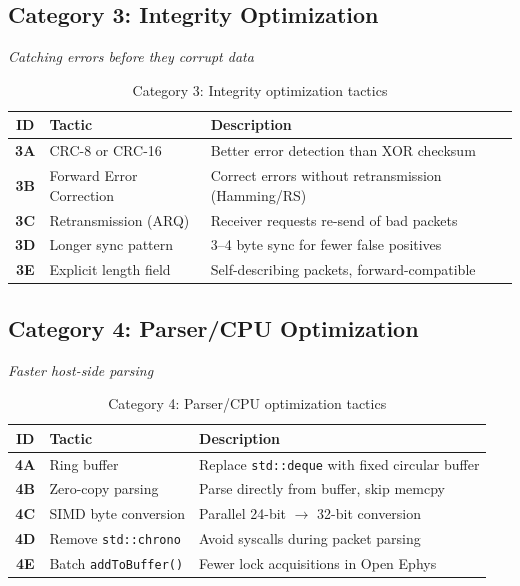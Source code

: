 \documentclass[11pt,a4paper]{article}
\newcommand{\tactic}[1]{\textbf{#1}}
\begin{document}
\subsection{Category 3: Integrity Optimization}
\textit{Catching errors before they corrupt data}

\begin{table}[H]
\centering
\small
\begin{tabularx}{\textwidth}{|c|l|X|}
\hline
\textbf{ID} & \textbf{Tactic} & \textbf{Description} \\\hline
\tactic{3A} & CRC-8 or CRC-16 & Better error detection than XOR checksum \\
\tactic{3B} & Forward Error Correction & Correct errors without retransmission (Hamming/RS) \\
\tactic{3C} & Retransmission (ARQ) & Receiver requests re-send of bad packets \\
\tactic{3D} & Longer sync pattern & 3--4 byte sync for fewer false positives \\
\tactic{3E} & Explicit length field & Self-describing packets, forward-compatible \\
\hline
\end{tabularx}
\caption{Category 3: Integrity optimization tactics}
\end{table}

\subsection{Category 4: Parser/CPU Optimization}
\textit{Faster host-side parsing}

\begin{table}[H]
\centering
\small
\begin{tabularx}{\textwidth}{|c|l|X|}
\hline
\textbf{ID} & \textbf{Tactic} & \textbf{Description} \\\hline
\tactic{4A} & Ring buffer & Replace \texttt{std::deque} with fixed circular buffer \\
\tactic{4B} & Zero-copy parsing & Parse directly from buffer, skip memcpy \\
\tactic{4C} & SIMD byte conversion & Parallel 24-bit $\to$ 32-bit conversion \\
\tactic{4D} & Remove \texttt{std::chrono} & Avoid syscalls during packet parsing \\
\tactic{4E} & Batch \texttt{addToBuffer()} & Fewer lock acquisitions in Open Ephys \\
\hline
\end{tabularx}
\caption{Category 4: Parser/CPU optimization tactics}
\end{table}
\end{document}
